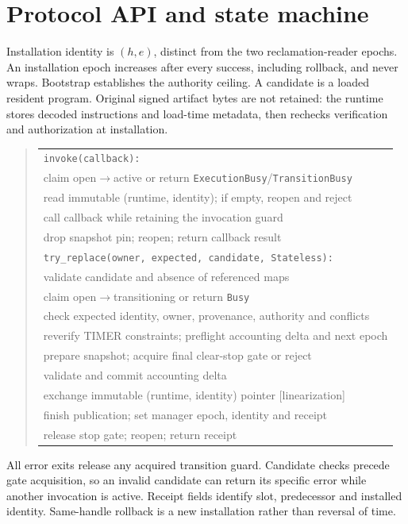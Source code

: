 \section{Protocol API and state machine}
\label{app:protocol}
Installation identity is $(h,e)$, distinct from the two reclamation-reader epochs. An installation epoch increases after every success, including rollback, and never wraps. Bootstrap establishes the authority ceiling. A candidate is a loaded resident program. Original signed artifact bytes are not retained: the runtime stores decoded instructions and load-time metadata, then rechecks verification and authorization at installation.

\begin{quote}\small
\begin{tabular}{@{}l@{}}
\texttt{invoke(callback):}\\
\quad claim open$\rightarrow$active or return \texttt{ExecutionBusy}/\texttt{TransitionBusy}\\
\quad read immutable (runtime, identity); if empty, reopen and reject\\
\quad call callback while retaining the invocation guard\\
\quad drop snapshot pin; reopen; return callback result\\[3pt]
\texttt{try\_replace(owner, expected, candidate, Stateless):}\\
\quad validate candidate and absence of referenced maps\\
\quad claim open$\rightarrow$transitioning or return \texttt{Busy}\\
\quad check expected identity, owner, provenance, authority and conflicts\\
\quad reverify TIMER constraints; preflight accounting delta and next epoch\\
\quad prepare snapshot; acquire final clear-stop gate or reject\\
\quad validate and commit accounting delta\\
\quad exchange immutable (runtime, identity) pointer [linearization]\\
\quad finish publication; set manager epoch, identity and receipt\\
\quad release stop gate; reopen; return receipt
\end{tabular}
\end{quote}

All error exits release any acquired transition guard. Candidate checks precede gate acquisition, so an invalid candidate can return its specific error while another invocation is active. Receipt fields identify slot, predecessor and installed identity. Same-handle rollback is a new installation rather than reversal of time.

